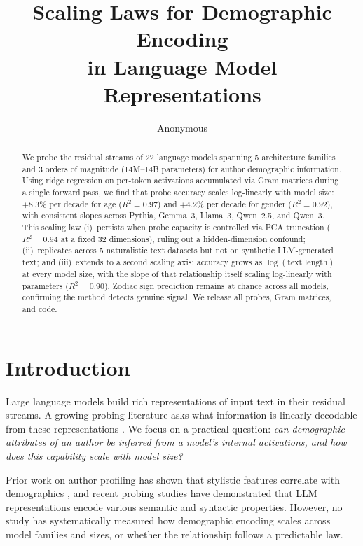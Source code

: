 \documentclass{article}
\title{Scaling Laws for Demographic Encoding\\in Language Model Representations}
\author{
Anonymous
}
\begin{document}
\maketitle

\begin{abstract}
We probe the residual streams of 22 language models spanning 5 architecture families and 3 orders of magnitude (14M--14B parameters) for author demographic information. Using ridge regression on per-token activations accumulated via Gram matrices during a single forward pass, we find that probe accuracy scales log-linearly with model size: $+8.3\%$ per decade for age ($R^2\!=\!0.97$) and $+4.2\%$ per decade for gender ($R^2\!=\!0.92$), with consistent slopes across Pythia, Gemma~3, Llama~3, Qwen~2.5, and Qwen~3. This scaling law (i)~persists when probe capacity is controlled via PCA truncation ($R^2\!=\!0.94$ at a fixed 32 dimensions), ruling out a hidden-dimension confound; (ii)~replicates across 5 naturalistic text datasets but not on synthetic LLM-generated text; and (iii)~extends to a second scaling axis: accuracy grows as $\log(\text{text length})$ at every model size, with the slope of that relationship itself scaling log-linearly with parameters ($R^2\!=\!0.90$). Zodiac sign prediction remains at chance across all models, confirming the method detects genuine signal. We release all probes, Gram matrices, and code.
\end{abstract}

\section{Introduction}

Large language models build rich representations of input text in their residual streams. A growing probing literature asks what information is linearly decodable from these representations \citep{alain2017understanding, belinkov2022probing, hewitt2019structural}. We focus on a practical question: \emph{can demographic attributes of an author be inferred from a model's internal activations, and how does this capability scale with model size?}

Prior work on author profiling has shown that stylistic features correlate with demographics \citep{schler2006effects}, and recent probing studies have demonstrated that LLM representations encode various semantic and syntactic properties. However, no study has systematically measured how demographic encoding scales across model families and sizes, or whether the relationship follows a predictable law.
\end{document}
